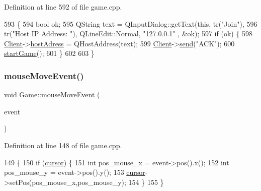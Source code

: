 Definition at line 592 of file game.\+cpp.


\begin{DoxyCode}
593 \{
594     \textcolor{keywordtype}{bool} ok;
595     QString text = QInputDialog::getText(\textcolor{keyword}{this}, tr(\textcolor{stringliteral}{"Join"}),
596                                          tr(\textcolor{stringliteral}{"Host IP Address: "}), QLineEdit::Normal, \textcolor{stringliteral}{"127.0.0.1"} , &ok);
597     \textcolor{keywordflow}{if} (ok) \{
598         \hyperlink{class_game_aa7fd8508fad68c550129f2be61c37467}{Client}->\hyperlink{class_u_d_p_socket_aacd808913633488ab008e8aa7ff8d9cf}{hostAdress} = QHostAddress(text);
599         \hyperlink{class_game_aa7fd8508fad68c550129f2be61c37467}{Client}->\hyperlink{class_u_d_p_socket_a66a6c4663cc3084cb4d76583e8039083}{send}(\textcolor{stringliteral}{"ACK"});
600         \hyperlink{class_game_ae8638ccdb0ef3bf39a6affa30aa1258f}{startGame}();
601     \}
602 
603 \}
\end{DoxyCode}
\mbox{\label{class_game_ad761e49ff42758930e76b477d08ba068}} 
\subsubsection{\texorpdfstring{mouse\+Move\+Event()}{mouseMoveEvent()}}
{\footnotesize\ttfamily void Game\+::mouse\+Move\+Event (\begin{DoxyParamCaption}\item[{Q\+Mouse\+Event $\ast$}]{event }\end{DoxyParamCaption})}



Definition at line 148 of file game.\+cpp.


\begin{DoxyCode}
149 \{
150     \textcolor{keywordflow}{if} (\hyperlink{class_game_ac8bde3bd16f503846f66bbb866c3b7b9}{cursor}) \{
151         \textcolor{keywordtype}{int} pos\_mouse\_x = \textcolor{keyword}{event}->pos().x();
152         \textcolor{keywordtype}{int} pos\_mouse\_y = \textcolor{keyword}{event}->pos().y();
153         \hyperlink{class_game_ac8bde3bd16f503846f66bbb866c3b7b9}{cursor}->setPos(pos\_mouse\_x,pos\_mouse\_y);
154     \}
155 \}
\end{DoxyCode}
\mbox{\label{class_game_a704ba119948eebd1b6dfc547de967796}} 
